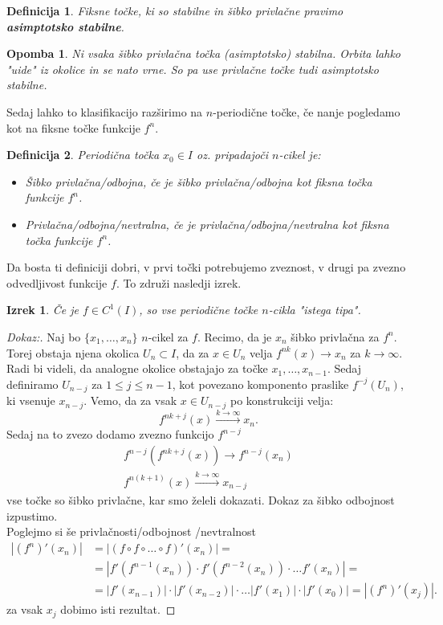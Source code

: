 \documentclass{article}
\newtheorem{definicija}{Definicija}
\newtheorem{opomba}{Opomba}
\newtheorem{izrek}{Izrek}
\begin{document}
\begin{definicija}
Fiksne točke, ki so stabilne in šibko privlačne pravimo \textbf{asimptotsko stabilne}.
\end{definicija}

\begin{opomba}
Ni vsaka šibko privlačna točka (asimptotsko) stabilna. Orbita lahko "uide"
iz okolice in se nato vrne. So pa use privlačne točke tudi asimptotsko stabilne.
\end{opomba}

Sedaj lahko to klasifikacijo razširimo na $n$-periodične točke, če nanje pogledamo kot na fiksne točke funkcije $f^n$.
\begin{definicija}
Periodična točka $x_0 \in I$ oz. pripadajoči $n$-cikel je:
\begin{itemize}
\item Šibko privlačna\slash odbojna, če je šibko privlačna\slash odbojna kot fiksna točka funkcije $f^n$.
\item Privlačna\slash odbojna\slash nevtralna, če je privlačna\slash odbojna\slash nevtralna kot fiksna točka funkcije $f^n$. 
\end{itemize}
\end{definicija}
Da bosta ti definiciji dobri, v prvi točki potrebujemo zveznost, v drugi pa zvezno odvedljivost funkcije $f$. To združi nasledji izrek.
\begin{izrek}
Če je $f\in C^1(I)$, so vse periodične točke $n$-cikla "istega tipa".
\end{izrek}

\begin{proof}[Dokaz:]
Naj bo $\{x_1, \dots, x_n\}$ $n$-cikel za $f$. Recimo, da je $x_n$ šibko privlačna 
za $f^n$. Torej obstaja njena okolica $U_n \subset I$, da za 
$x\in U_n$ velja $f^{nk}(x) \rightarrow x_n$ za $k\rightarrow \infty$. 
Radi bi videli, da analogne okolice obstajajo za točke 
$x_1, \dots, x_{n-1}$. Sedaj definiramo $U_{n-j}$ za $1 \leq j \leq n-1$, 
kot povezano komponento praslike $f^{-j}(U_n)$, ki vsenuje $x_{n-j}$. Vemo,
da za vsak $x\in U_{n-j}$ po konstrukciji velja:
$$
f^{nk + j}(x) \xrightarrow{k\rightarrow \infty} x_n.
$$
Sedaj na to zvezo dodamo zvezno funkcijo $f^{n-j}$
\begin{align*}
f^{n-j}(f^{nk + j}(x)) \rightarrow f^{n-j}(x_n) \\ 
f^{n(k+1)}(x) \xrightarrow{k\rightarrow \infty} x_{n-j} 
\end{align*}
vse točke so šibko privlačne, kar smo želeli dokazati. Dokaz za šibko odbojnost izpustimo.\\[3mm]
Poglejmo si še privlačnosti\slash odbojnost \slash nevtralnost
\begin{align*}
|(f^n)'(x_n)| &= |(f \circ f \circ \dots \circ f)'(x_n)| = \\ 
&= |f'(f^{n-1}(x_n)) \cdot f'(f^{n-2}(x_n)) \cdot \dots f'(x_n)| = \\ 
&= |f'(x_{n-1})| \cdot |f'(x_{n-2})| \cdot \dots |f'(x_1)| \cdot |f'(x_0)| = |(f^n)'(x_j)|.
\end{align*}
za vsak $x_j$ dobimo isti rezultat.
\end{proof}
\end{document}

